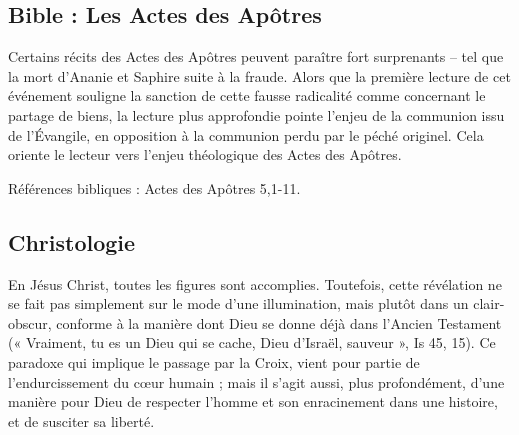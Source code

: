 \subsection{Bible : Les Actes des Apôtres}

Certains récits des Actes des Apôtres peuvent paraître fort surprenants – tel que la mort d’Ananie et Saphire suite à la fraude. Alors que la première lecture de cet événement souligne la sanction de cette fausse radicalité comme concernant le partage de biens, la lecture plus approfondie pointe l’enjeu de la communion issu de l’Évangile, en opposition à la communion perdu par le péché originel. Cela oriente le lecteur vers l’enjeu théologique des Actes des Apôtres.\\

\begin{references}
	

	
	Références bibliques : Actes des Apôtres 5,1-11.

\end{references}


\subsection{Christologie}

En Jésus Christ, toutes les figures sont accomplies. Toutefois, cette révélation ne se fait pas simplement sur le mode d'une illumination, mais plutôt dans un clair-obscur, conforme à la manière dont Dieu se donne déjà dans l'Ancien Testament (« Vraiment, tu es un Dieu qui se cache, Dieu d'Israël, sauveur », Is 45, 15). Ce paradoxe qui implique le passage par la Croix, vient pour partie de l'endurcissement du cœur humain ; mais il s'agit aussi, plus profondément, d'une manière pour Dieu de respecter l'homme et son enracinement dans une histoire, et de susciter sa liberté.\\

\begin{references}



 
\end{references}


